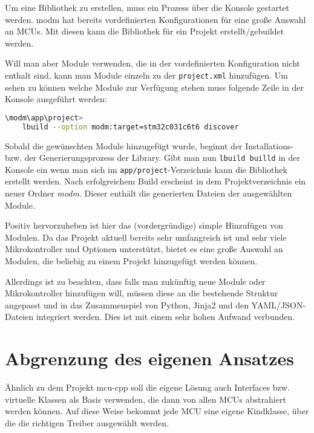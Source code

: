 Um eine Bibliothek zu erstellen, muss ein Prozess über die Konsole gestartet werden.
modm hat bereits vordefinierten Konfigurationen für eine große Auswahl an MCUs.
Mit diesen kann die Bibliothek für ein Projekt erstellt/gebuildet werden.

Will man aber Module verwenden, die in der vordefinierten Konfiguration nicht enthalt sind, kann man Module einzeln zu der \texttt{project.xml} hinzufügen.
Um sehen zu können welche Module zur Verfügung stehen muss folgende Zeile in der Konsole ausgeführt werden:

\vspace{3mm}
\begin{lstlisting}[language=bash, caption={Konsolenbefehl um verf\"ugbare Module aufgelistet zu bekommen; hier f\"ur den STM32C031C6T6 Mikrokontroller.}, label={lst:modm_lbild_discover}]
\modm\app\project>
	lbuild --option modm:target=stm32c031c6t6 discover
\end{lstlisting}

Sobald die gewünschten Module hinzugefügt wurde, beginnt der Installations- bzw. der Generierungsprozess der Library. 
Gibt man nun \texttt{lbuild builld} in der Konsole ein wenn man sich im \texttt{app/project}-Verzeichnis kann die Bibliothek erstellt werden.
Nach erfolgreichem Build erscheint in dem Projektverzeichnis ein neuer Ordner \emph{modm}.
Dieser enthält die generierten Dateien der ausgewählten Module.

Positiv hervorzuheben ist hier das (vordergründige) simple Hinzufügen von Modulen.
Da das Projekt aktuell bereits sehr umfangreich ist und sehr viele Mikrokontroller und Optionen unterstützt, bietet es eine große Auswahl an Modulen, die beliebig zu einem Projekt hinzugefügt werden können.

Allerdings ist zu beachten, dass falls man zukünftig neue Module oder Mikrokontroller hinzufügen will, müssen diese an die bestehende Struktur angepasst und in das Zusammenspiel von Python, Jinja2 und den YAML/JSON-Dateien integriert werden.
Dies ist mit einem sehr hohen Aufwand verbunden.



\section{Abgrenzung des eigenen Ansatzes}
Ähnlich zu dem Projekt mcu-cpp soll die eigene Lösung auch Interfaces bzw. virtuelle Klassen als Basis verwenden, die dann von allen MCUs abstrahiert werden können.
Auf diese Weise bekommt jede MCU eine eigene Kindklasse, über die die richtigen Treiber ausgewählt werden.










